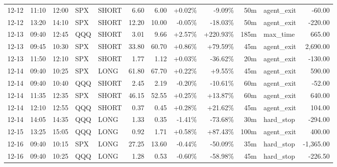 \documentclass[11pt,a4paper,twoside]{article}
\begin{document}
\begin{center}
\begin{longtable}{>{\color{txtmain}}l l l l l r r r r r >{\color{txtmain}}l r}
12-12 & 11:10 & 12:00 & SPX & SHORT & 6.60 & 6.00 & \textcolor{wingreen}{+0.02\%} & \textcolor{lossred}{-9.09\%} & 50m & agent\_exit & \textcolor{lossred}{-60.00} \\
12-12 & 13:20 & 14:10 & SPX & SHORT & 12.20 & 10.00 & \textcolor{lossred}{-0.05\%} & \textcolor{lossred}{-18.03\%} & 50m & agent\_exit & \textcolor{lossred}{-220.00} \\
12-13 & 09:40 & 12:45 & QQQ & SHORT & 3.01 & 9.66 & \textcolor{wingreen}{+2.57\%} & \textcolor{wingreen}{+220.93\%} & 185m & max\_time & \textcolor{wingreen}{665.00} \\
12-13 & 09:45 & 10:30 & SPX & SHORT & 33.80 & 60.70 & \textcolor{wingreen}{+0.86\%} & \textcolor{wingreen}{+79.59\%} & 45m & agent\_exit & \textcolor{wingreen}{2,690.00} \\
12-13 & 11:50 & 12:10 & SPX & SHORT & 1.77 & 1.12 & \textcolor{wingreen}{+0.03\%} & \textcolor{lossred}{-36.62\%} & 20m & agent\_exit & \textcolor{lossred}{-130.00} \\
12-14 & 09:40 & 10:25 & SPX & LONG & 61.80 & 67.70 & \textcolor{wingreen}{+0.22\%} & \textcolor{wingreen}{+9.55\%} & 45m & agent\_exit & \textcolor{wingreen}{590.00} \\
12-14 & 09:40 & 10:40 & QQQ & SHORT & 2.45 & 2.19 & \textcolor{lossred}{-0.20\%} & \textcolor{lossred}{-10.61\%} & 60m & agent\_exit & \textcolor{lossred}{-52.00} \\
12-14 & 11:35 & 12:35 & SPX & SHORT & 46.15 & 52.55 & \textcolor{wingreen}{+0.25\%} & \textcolor{wingreen}{+13.87\%} & 60m & agent\_exit & \textcolor{wingreen}{640.00} \\
12-14 & 12:10 & 12:55 & QQQ & SHORT & 0.37 & 0.45 & \textcolor{wingreen}{+0.28\%} & \textcolor{wingreen}{+21.62\%} & 45m & agent\_exit & \textcolor{wingreen}{104.00} \\
12-14 & 14:05 & 14:35 & QQQ & LONG & 1.33 & 0.35 & \textcolor{lossred}{-1.41\%} & \textcolor{lossred}{-73.68\%} & 30m & hard\_stop & \textcolor{lossred}{-294.00} \\
12-15 & 13:25 & 15:05 & QQQ & LONG & 0.92 & 1.71 & \textcolor{wingreen}{+0.58\%} & \textcolor{wingreen}{+87.43\%} & 100m & agent\_exit & \textcolor{wingreen}{400.00} \\
12-16 & 09:40 & 10:15 & SPX & LONG & 27.25 & 13.60 & \textcolor{lossred}{-0.44\%} & \textcolor{lossred}{-50.09\%} & 35m & hard\_stop & \textcolor{lossred}{-1,365.00} \\
12-16 & 09:40 & 10:25 & QQQ & LONG & 1.28 & 0.53 & \textcolor{lossred}{-0.60\%} & \textcolor{lossred}{-58.98\%} & 45m & hard\_stop & \textcolor{lossred}{-226.50} \\

\end{longtable}
\end{center}
\end{document}
